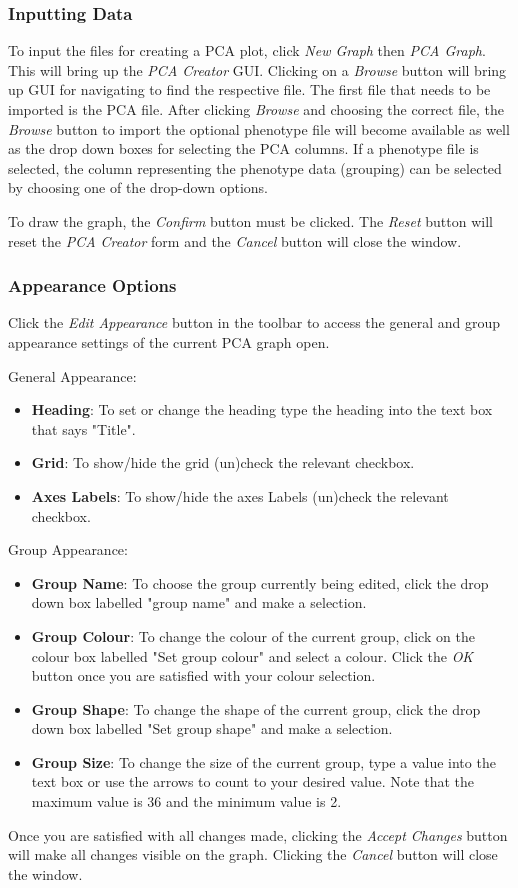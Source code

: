\documentclass[11pt]{article}
\begin{document}
\subsubsection{Inputting Data}
To input the files for creating a PCA plot, click \textit{New Graph} then \textit{PCA Graph}. This will bring up the \textit{PCA Creator} GUI.
Clicking on a \textit{Browse} button will bring up GUI for navigating to find the respective file.
The first file that needs to be imported is the PCA file. After clicking \textit{Browse} and choosing the correct file, the \textit{Browse} button to import the optional phenotype file will become available as well as the drop down boxes for selecting the PCA columns. 
If a phenotype file is selected, the column representing the phenotype data (grouping) can be selected by choosing one of the drop-down options.

To draw the graph, the \textit{Confirm} button must be clicked. The \textit{Reset} button will reset the \textit{PCA Creator} form and the \textit{Cancel} button will close the window.
\subsubsection{Appearance Options}
Click the \textit{Edit Appearance} button in the toolbar to access the general and group appearance settings of the current PCA graph open.

General Appearance:
\begin{itemize}
\item \textbf{Heading}: To set or change the heading type the heading into the text box that says "Title".
\item \textbf{Grid}: To show/hide the grid (un)check the relevant checkbox.
\item \textbf{Axes Labels}: To show/hide the axes Labels (un)check the relevant checkbox.
\end{itemize}

Group Appearance:
\begin{itemize}
\item \textbf{Group Name}: To choose the group currently being edited, click the drop down box labelled "group name" and make a selection.
\item \textbf{Group Colour}: To change the colour of the current group, click on the colour box labelled "Set group colour" and select a colour. Click the \textit{OK} button once you are satisfied with your colour selection.
\item \textbf{Group Shape}: To change the shape of the current group, click the drop down box labelled "Set group shape" and make a selection.
\item \textbf{Group Size}: To change the size of the current group, type a value into the text box or use the arrows to count to your desired value. Note that the maximum value is 36 and the minimum value is 2.
\end{itemize}
Once you are satisfied with all changes made, clicking the \textit{Accept Changes} button will make all changes visible on the graph. Clicking the \textit{Cancel} button will close the window.
\end{document}
